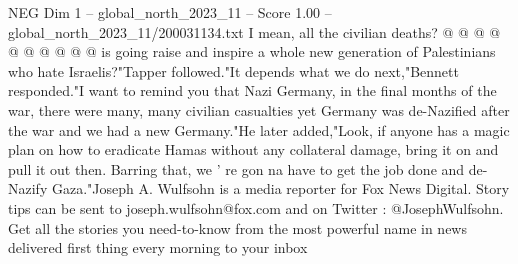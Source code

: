\begin{textsample}{NEG Dim 1 – global\_north\_2023\_11 – Score 1.00 – global\_north\_2023\_11/200031134.txt}
I mean, all the civilian deaths? @ @ @ @ @ @ @ @ @ @ is going raise and inspire a whole new generation of Palestinians who hate Israelis?"Tapper followed."It depends what we do next,"Bennett responded."I want to remind you that Nazi Germany, in the final months of the war, there were many, many civilian casualties yet Germany was de-Nazified after the war and we had a new Germany."He later added,"Look, if anyone has a magic plan on how to eradicate Hamas without any collateral damage, bring it on and pull it out then.
Barring that, we ' re gon na have to get the job done and de-Nazify Gaza."Joseph A.
Wulfsohn is a media reporter for Fox News Digital.
Story tips can be sent to joseph.wulfsohn@fox.com and on Twitter : @JosephWulfsohn.
Get all the stories you need-to-know from the most powerful name in news delivered first thing every morning to your inbox

\end{textsample}
